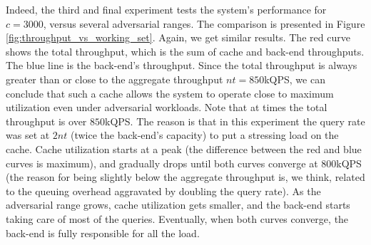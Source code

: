\documentclass[10pt,letterpaper]{article}
\begin{document}
Indeed, the third and final experiment tests the system's performance for $c = 3000$, versus several adversarial ranges. The comparison is presented in Figure \ref{fig:throughput_vs_working_set}. Again, we get similar results. The red curve shows the total throughput, which is the sum of cache and back-end throughputs. The blue line is the back-end's throughput. Since the total throughput is always greater than or close to the aggregate throughput $nt = 850$kQPS, we can conclude that such a cache allows the system to operate close to maximum utilization even under adversarial workloads. Note that at times the total throughput is over $850$kQPS. The reason is that in this experiment the query rate was set at $2nt$ (twice the back-end's capacity) to put a stressing load on the cache. Cache utilization starts at a peak (the difference between the red and blue curves is maximum), and gradually drops until both curves converge at $800$kQPS (the reason for being slightly below the aggregate throughput is, we think, related to the queuing overhead aggravated by doubling the query rate). As the adversarial range grows, cache utilization gets smaller, and the back-end starts taking care of most of the queries. Eventually, when both curves converge, the back-end is fully responsible for all the load.
\end{document}
